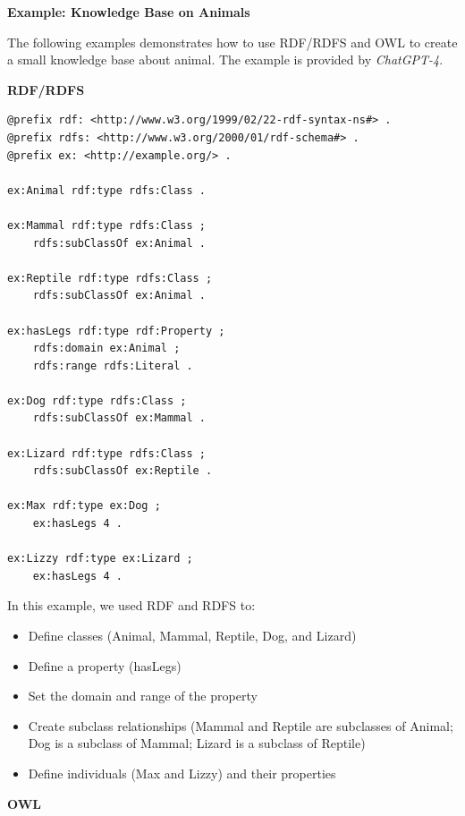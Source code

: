 \begin{mdframed}

\vspace{0.1in}
{\centering \textbf{Example: Knowledge Base on Animals}}
\vspace{0.1in}

The following examples demonstrates how to use RDF/RDFS and OWL to create a small knowledge base about animal. The example is provided by \textit{ChatGPT-4}.

\vspace{0.1in}
\noindent \textbf{RDF/RDFS}
\vspace{0.1in}

\begin{lstlisting}
@prefix rdf: <http://www.w3.org/1999/02/22-rdf-syntax-ns#> .
@prefix rdfs: <http://www.w3.org/2000/01/rdf-schema#> .
@prefix ex: <http://example.org/> .

ex:Animal rdf:type rdfs:Class .

ex:Mammal rdf:type rdfs:Class ;
    rdfs:subClassOf ex:Animal .

ex:Reptile rdf:type rdfs:Class ;
    rdfs:subClassOf ex:Animal .

ex:hasLegs rdf:type rdf:Property ;
    rdfs:domain ex:Animal ;
    rdfs:range rdfs:Literal .

ex:Dog rdf:type rdfs:Class ;
    rdfs:subClassOf ex:Mammal .

ex:Lizard rdf:type rdfs:Class ;
    rdfs:subClassOf ex:Reptile .

ex:Max rdf:type ex:Dog ;
    ex:hasLegs 4 .

ex:Lizzy rdf:type ex:Lizard ;
    ex:hasLegs 4 .
\end{lstlisting}

In this example, we used RDF and RDFS to:
\begin{itemize}
  \item Define classes (Animal, Mammal, Reptile, Dog, and Lizard)
  \item Define a property (hasLegs)
  \item Set the domain and range of the property
  \item Create subclass relationships (Mammal and Reptile are subclasses of Animal; Dog is a subclass of Mammal; Lizard is a subclass of Reptile)
  \item Define individuals (Max and Lizzy) and their properties
\end{itemize}

\vspace{0.1in}
\noindent \textbf{OWL}
\vspace{0.1in}


\end{mdframed}
